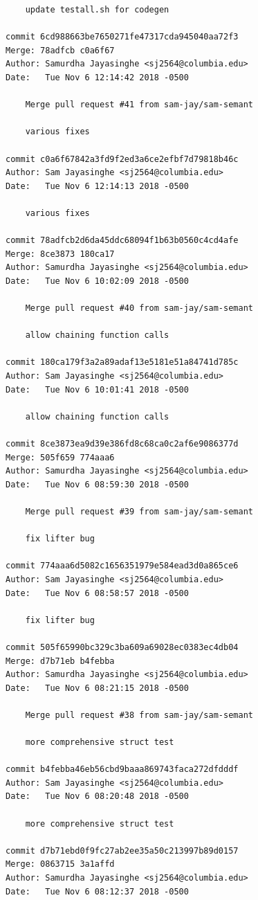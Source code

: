 \documentclass[12pt]{article}
\begin{document}
\begin{lstlisting}
    update testall.sh for codegen

commit 6cd988663be7650271fe47317cda945040aa72f3
Merge: 78adfcb c0a6f67
Author: Samurdha Jayasinghe <sj2564@columbia.edu>
Date:   Tue Nov 6 12:14:42 2018 -0500

    Merge pull request #41 from sam-jay/sam-semant
    
    various fixes

commit c0a6f67842a3fd9f2ed3a6ce2efbf7d79818b46c
Author: Sam Jayasinghe <sj2564@columbia.edu>
Date:   Tue Nov 6 12:14:13 2018 -0500

    various fixes

commit 78adfcb2d6da45ddc68094f1b63b0560c4cd4afe
Merge: 8ce3873 180ca17
Author: Samurdha Jayasinghe <sj2564@columbia.edu>
Date:   Tue Nov 6 10:02:09 2018 -0500

    Merge pull request #40 from sam-jay/sam-semant
    
    allow chaining function calls

commit 180ca179f3a2a89adaf13e5181e51a84741d785c
Author: Sam Jayasinghe <sj2564@columbia.edu>
Date:   Tue Nov 6 10:01:41 2018 -0500

    allow chaining function calls

commit 8ce3873ea9d39e386fd8c68ca0c2af6e9086377d
Merge: 505f659 774aaa6
Author: Samurdha Jayasinghe <sj2564@columbia.edu>
Date:   Tue Nov 6 08:59:30 2018 -0500

    Merge pull request #39 from sam-jay/sam-semant
    
    fix lifter bug

commit 774aaa6d5082c1656351979e584ead3d0a865ce6
Author: Sam Jayasinghe <sj2564@columbia.edu>
Date:   Tue Nov 6 08:58:57 2018 -0500

    fix lifter bug

commit 505f65990bc329c3ba609a69028ec0383ec4db04
Merge: d7b71eb b4febba
Author: Samurdha Jayasinghe <sj2564@columbia.edu>
Date:   Tue Nov 6 08:21:15 2018 -0500

    Merge pull request #38 from sam-jay/sam-semant
    
    more comprehensive struct test

commit b4febba46eb56cbd9baaa869743faca272dfdddf
Author: Sam Jayasinghe <sj2564@columbia.edu>
Date:   Tue Nov 6 08:20:48 2018 -0500

    more comprehensive struct test

commit d7b71ebd0f9fc27ab2ee35a50c213997b89d0157
Merge: 0863715 3a1affd
Author: Samurdha Jayasinghe <sj2564@columbia.edu>
Date:   Tue Nov 6 08:12:37 2018 -0500


\end{lstlisting}
\end{document}
